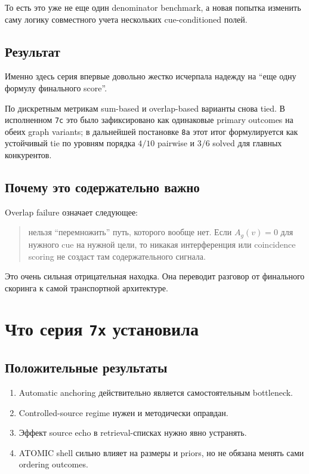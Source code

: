 То есть это уже не еще один denominator benchmark, а новая попытка изменить
саму логику совместного учета нескольких cue-conditioned полей.

\subsection{Результат}

Именно здесь серия впервые довольно жестко исчерпала надежду на ``еще одну
формулу финального score''.

По дискретным метрикам sum-based и overlap-based варианты снова tied. В
исполненном \texttt{7c} это было зафиксировано как одинаковые primary outcomes
на обеих graph variants; в дальнейшей постановке \texttt{8a} этот итог
формулируется как устойчивый tie по уровням порядка \(4/10\) pairwise и \(3/6\)
solved для главных конкурентов.

\subsection{Почему это содержательно важно}

Overlap failure означает следующее:

\begin{quote}
нельзя ``перемножить'' путь, которого вообще нет. Если $A_g(v)=0$ для нужного
cue на нужной цели, то никакая интерференция или coincidence scoring не создаст
там содержательного сигнала.
\end{quote}

Это очень сильная отрицательная находка. Она переводит разговор от финального
скоринга к самой транспортной архитектуре.

\section{Что серия \texttt{7x} установила}

\subsection{Положительные результаты}

\begin{enumerate}[leftmargin=2em]
\item Automatic anchoring действительно является самостоятельным bottleneck.
\item Controlled-source regime нужен и методически оправдан.
\item Эффект source echo в retrieval-списках нужно явно устранять.
\item ATOMIC shell сильно влияет на размеры и priors, но не обязана менять сами
ordering outcomes.
\end{enumerate}

